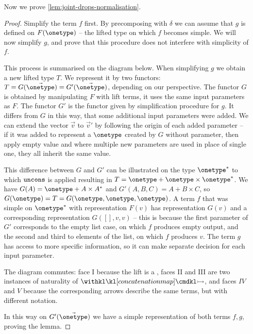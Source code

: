 Now we prove \cref{lem:joint-drops-normalisation}. 

\begin{proof}
    Simplify the term $f$ first. By precomposing with $\delta$ we can assume that $g$ is defined on $F(\onetype)$ -- the lifted type on which $f$ becomes simple. 
    We will now simplify $g$, and prove that this procedure does not interfere with simplicity of $f$.
    
    This process is summarised on the diagram below. When simplifying $g$ we obtain a new lifted type $T$.
    We represent it by two functors: $T = G(\vec\onetype) = G'(\vec\onetype)$, depending on our perspective. The functor $G$ is obtained by manipulating $F$ with lift terms, it uses the same input parameters as $F$. The functor $G'$ is the functor given by simplification procedure for $g$. It differs from $G$ in this way, that some additional input parameters were added. We can extend the vector $\vec v$ to $\vec v'$ by following the origin of each added parameter -- if it was added to represent a $\onetype$ created by $G$ without parameter, then apply empty value and where multiple new parameters are used in place of single one, they all inherit the same value.

    This difference between $G$ and $G'$ can be illustrated on the type $\onetype^*$ to which $\mathtt{uncons}$ is applied resulting in $T = \onetype  + \onetype \times \onetype^*$. We have $G(A) = \onetype + A \times A^*$ and $G'(A, B, C) = A + B \times C$, so $G(\onetype) = T = G(\onetype, \onetype, \onetype)$. A term $f$ that was simple on $\onetype^*$ with representation $F(v)$ has representation $G(v)$ and a corresponding representation $G([], v, v)$ -- this is because the first parameter of $G'$ corresponds to the empty list case, on which $f$ produces empty output, and the second and third to elements of the list, on which $f$ produces $v$. The term $g$ has access to more specific information, so it can make separate decision for each input parameter.

    The diagram commutes: face I because the lift is a , faces II and III are two instances of naturality of $\concmap$, and faces $IV$ and $V$ because the corresponding arrows describe the same terms, but with different notation.

    In this way on $G'(\vec \onetype)$ we have a simple representation of both terms $f, g$, proving the lemma.
      

\end{proof}
